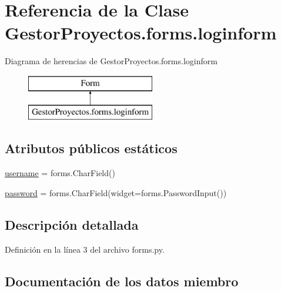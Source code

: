 \hypertarget{class_gestor_proyectos_1_1forms_1_1loginform}{}\section{Referencia de la Clase Gestor\+Proyectos.\+forms.\+loginform}
\label{class_gestor_proyectos_1_1forms_1_1loginform}
Diagrama de herencias de Gestor\+Proyectos.\+forms.\+loginform\begin{figure}[H]
\begin{center}
\leavevmode
\includegraphics[height=2.000000cm]{class_gestor_proyectos_1_1forms_1_1loginform}
\end{center}
\end{figure}
\subsection*{Atributos públicos estáticos}
\begin{DoxyCompactItemize}
\item 
\hyperlink{class_gestor_proyectos_1_1forms_1_1loginform_af0787c8288a4ba3b5651861969cbfe9f}{username} = forms.\+Char\+Field()
\item 
\hyperlink{class_gestor_proyectos_1_1forms_1_1loginform_a1c5ce794cd36522009344ea46565dcf6}{password} = forms.\+Char\+Field(widget=forms.\+Password\+Input())
\end{DoxyCompactItemize}


\subsection{Descripción detallada}


Definición en la línea 3 del archivo forms.\+py.



\subsection{Documentación de los datos miembro}
